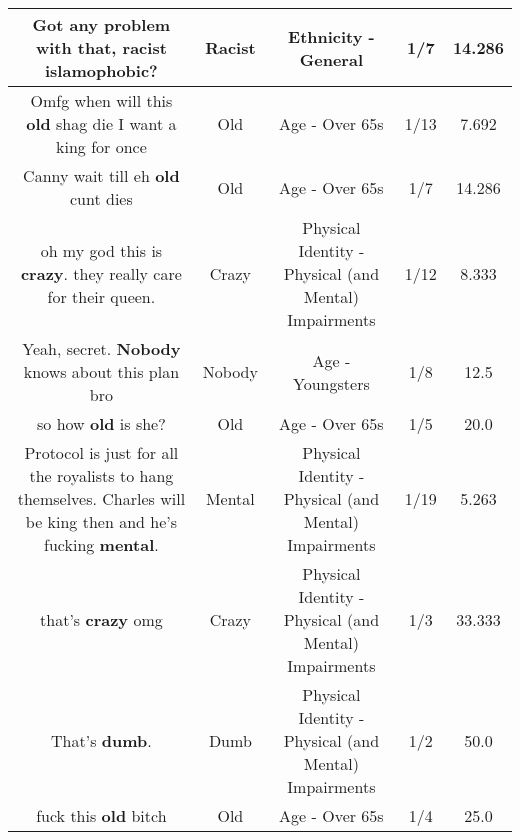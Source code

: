 \documentclass[11pt]{article}
\newlength\mylength
\begin{document}
\begin{center}
\begin{longtable}{|C{.65\mylength}|C{.30\mylength}|C{.12\mylength}|C{.12\mylength}|C{.12\mylength}|}
  \small Got any problem with that, \textbf{racist} islamophobic?\normalsize   & Racist & Ethnicity - General & 1/7 & 14.286 \\  \hline
  \small Omfg when will this \textbf{old} shag die I want a king for once\normalsize   & Old & Age - Over 65s & 1/13 & 7.692 \\  \hline
  \small Canny wait till eh \textbf{old} cunt dies\normalsize   & Old & Age - Over 65s & 1/7 & 14.286 \\  \hline
  \small oh my god this is \textbf{crazy}. they really care for their queen.\normalsize   & Crazy & Physical Identity - Physical (and Mental) Impairments & 1/12 & 8.333 \\  \hline
  \small Yeah, secret. \textbf{Nobody} knows about this plan bro\normalsize   & Nobody & Age - Youngsters & 1/8 & 12.5 \\  \hline
  \small so how \textbf{old} is she?\normalsize   & Old & Age - Over 65s & 1/5 & 20.0 \\  \hline
  \small Protocol is just for all the royalists to hang themselves. Charles will be king then and he's fucking \textbf{mental}.\normalsize   & Mental & Physical Identity - Physical (and Mental) Impairments & 1/19 & 5.263 \\  \hline
  \small that's \textbf{crazy} omg\normalsize   & Crazy & Physical Identity - Physical (and Mental) Impairments & 1/3 & 33.333 \\  \hline
  \small That's \textbf{dumb}.\normalsize   & Dumb & Physical Identity - Physical (and Mental) Impairments & 1/2 & 50.0 \\  \hline
  \small fuck this \textbf{old} bitch\normalsize   & Old & Age - Over 65s & 1/4 & 25.0 \\  \hline

\end{longtable}
\end{center}
\end{document}
